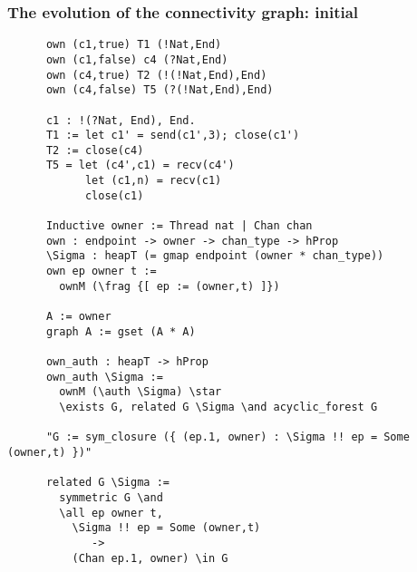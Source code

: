 \documentclass[aspectratio=169]{beamer}
\begin{document}
\begin{frame}[fragile]
  \frametitle{The evolution of the connectivity graph: initial}

    \begin{verbatim}
      own (c1,true) T1 (!Nat,End)
      own (c1,false) c4 (?Nat,End)
      own (c4,true) T2 (!(!Nat,End),End)
      own (c4,false) T5 (?(!Nat,End),End)

      c1 : !(?Nat, End), End.
      T1 := let c1' = send(c1',3); close(c1')
      T2 := close(c4)
      T5 = let (c4',c1) = recv(c4')
            let (c1,n) = recv(c1)
            close(c1)

      Inductive owner := Thread nat | Chan chan
      own : endpoint -> owner -> chan_type -> hProp
      \Sigma : heapT (= gmap endpoint (owner * chan_type))
      own ep owner t :=
        ownM (\frag {[ ep := (owner,t) ]})

      A := owner
      graph A := gset (A * A)

      own_auth : heapT -> hProp
      own_auth \Sigma :=
        ownM (\auth \Sigma) \star
        \exists G, related G \Sigma \and acyclic_forest G

      "G := sym_closure ({ (ep.1, owner) : \Sigma !! ep = Some (owner,t) })"

      related G \Sigma :=
        symmetric G \and
        \all ep owner t,
          \Sigma !! ep = Some (owner,t)
             ->
          (Chan ep.1, owner) \in G

    \end{verbatim}
\end{frame}
\end{document}
